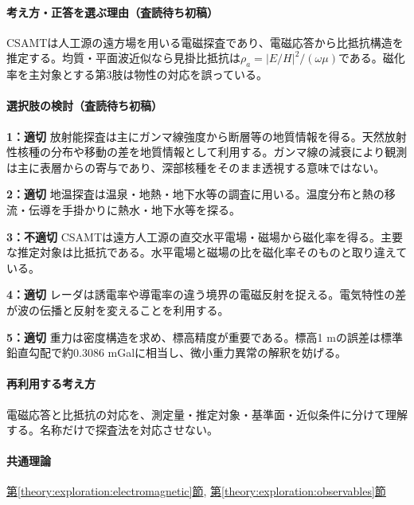 \paragraph{考え方・正答を選ぶ理由（査読待ち初稿）} CSAMTは人工源の遠方場を用いる電磁探査であり、電磁応答から比抵抗構造を推定する。均質・平面波近似なら見掛比抵抗は\(\rho_a=|E/H|^2/(\omega\mu)\)である。磁化率を主対象とする第3肢は物性の対応を誤っている。

\paragraph{選択肢の検討（査読待ち初稿）}\mbox{}\par

\noindent\textbf{1：適切} 放射能探査は主にガンマ線強度から断層等の地質情報を得る。天然放射性核種の分布や移動の差を地質情報として利用する。ガンマ線の減衰により観測は主に表層からの寄与であり、深部核種をそのまま透視する意味ではない。\par

\noindent\textbf{2：適切} 地温探査は温泉・地熱・地下水等の調査に用いる。温度分布と熱の移流・伝導を手掛かりに熱水・地下水等を探る。\par

\noindent\textbf{3：不適切} CSAMTは遠方人工源の直交水平電場・磁場から磁化率を得る。主要な推定対象は比抵抗である。水平電場と磁場の比を磁化率そのものと取り違えている。\par

\noindent\textbf{4：適切} レーダは誘電率や導電率の違う境界の電磁反射を捉える。電気特性の差が波の伝播と反射を変えることを利用する。\par

\noindent\textbf{5：適切} 重力は密度構造を求め、標高精度が重要である。標高1 mの誤差は標準鉛直勾配で約0.3086 mGalに相当し、微小重力異常の解釈を妨げる。\par

\paragraph{再利用する考え方} 電磁応答と比抵抗の対応を、測定量・推定対象・基準面・近似条件に分けて理解する。名称だけで探査法を対応させない。

\paragraph{共通理論} \hyperref[theory:exploration:electromagnetic]{第\ref*{theory:exploration:electromagnetic}節}, \hyperref[theory:exploration:observables]{第\ref*{theory:exploration:observables}節}

